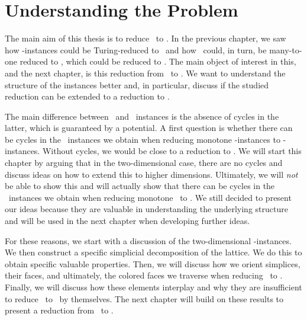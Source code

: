 \setchapterpreamble[u]{\margintoc}
\chapter{Understanding the Problem}\label{ch:understanding_the_problem}

The main aim of this thesis is to reduce \Tarski\ to \EndOfPotentialLine\@. In the previous chapter, we saw how \Tarski-instances could be Turing-reduced to \Tarskistar\ and how \Tarskistar\ could, in turn, be many-to-one reduced to \Sperner, which could be reduced to \EndOfLine. The main object of interest in this, and the next chapter, is this reduction from \Tarski\ to \EndOfLine. We want to understand the structure of the instances better and, in particular, discuss if the studied reduction can be extended to a reduction to \EndOfPotentialLine\@.

The main difference between \EndOfLine\ and \EndOfPotentialLine\ instances is the absence of cycles in the latter, which is guaranteed by a potential. A first question is whether there can be cycles in the \EndOfLine\ instances we obtain when reducing monotone \Tarskistar-instances to \EndOfLine-instances. Without cycles, we would be close to a reduction to \EndOfPotentialLine\@. We will start this chapter by arguing that in the two-dimensional case, there are no cycles and discuss ideas on how to extend this to higher dimensions. Ultimately, we will \emph{not} be able to show this and will actually show that there can be cycles in the \EndOfLine\ instances we obtain when reducing monotone \Tarskistar\ to \EndOfLine\@. We still decided to present our ideas because they are valuable in understanding the underlying structure and will be used in the next chapter when developing further ideas.

For these reasons, we start with a discussion of the two-dimensional \Tarskistar-instances. We then construct a specific simplicial decomposition of the lattice. We do this to obtain specific valuable properties. Then, we will discuss how we orient simplices, their faces, and ultimately, the colored faces we traverse when reducing \Sperner\ to \EndOfLine. Finally, we will discuss how these elements interplay and why they are insufficient to reduce \Tarski\ to \EndOfPotentialLine\ by themselves. The next chapter will build on these results to present a reduction from \Tarski\ to \EndOfPotentialLine\@.


